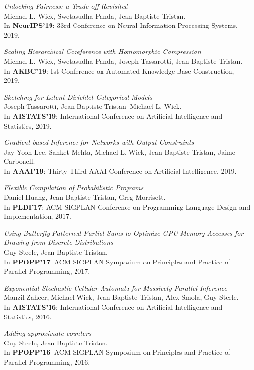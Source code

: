 \documentclass[margin,line]{res}
\begin{document}
\begin{resume}
\emph{Unlocking Fairness: a Trade-off Revisited}\\
Michael L. Wick, Swetasudha Panda, Jean-Baptiste Tristan.\\
In {\bf NeurIPS'19}: 33rd Conference on Neural Information Processing Systems, 2019.

\emph{Scaling Hierarchical Coreference with Homomorphic Compression}\\
Michael L. Wick, Swetasudha Panda, Joseph Tassarotti, Jean-Baptiste Tristan.\\
In {\bf AKBC'19}: 1st Conference on Automated Knowledge Base Construction, 2019.

\emph{Sketching for Latent Dirichlet-Categorical Models}\\
Joseph Tassarotti, Jean-Baptiste Tristan, Michael L. Wick.\\
In {\bf AISTATS'19}: International Conference on 
Artificial Intelligence and Statistics, 2019.

\emph{Gradient-based Inference for Networks with Output Constraints}\\
Jay-Yoon Lee, Sanket Mehta, Michael L. Wick, Jean-Baptiste Tristan, Jaime Carbonell.\\
In {\bf AAAI'19}: Thirty-Third AAAI Conference on Artificial Intelligence, 2019.

\emph{Flexible Compilation of Probabilistic Programs}\\
Daniel Huang, Jean-Baptiste Tristan, Greg Morrisett.\\
In {\bf PLDI'17}: ACM SIGPLAN Conference on Programming
Language Design and Implementation, 2017.

\emph{Using Butterfly-Patterned Partial Sums to Optimize GPU Memory Accesses for Drawing from Discrete Distributions}\\
Guy Steele, Jean-Baptiste Tristan.\\
In {\bf PPOPP'17}: ACM SIGPLAN Symposium on
Principles and Practice of Parallel Programming, 2017. 

\emph{Exponential Stochastic Cellular Automata for Massively Parallel Inference}\\
Manzil Zaheer, Michael Wick, Jean-Baptiste Tristan, Alex Smola, Guy Steele.\\
In {\bf AISTATS'16}: International Conference on 
Artificial Intelligence and Statistics, 2016. 

\emph{Adding approximate counters}\\
Guy Steele, Jean-Baptiste Tristan.\\
In {\bf PPOPP'16}: ACM SIGPLAN Symposium on
Principles and Practice of Parallel Programming, 2016. 


\end{resume}
\end{document}
